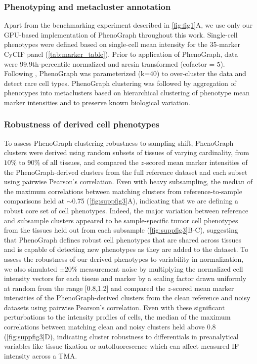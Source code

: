 \documentclass[preprint,review,3p,12pt]{elsarticle}
\begin{document}
\subsubsection{Phenotyping and metacluster annotation}
Apart from the benchmarking experiment described in \autoref{fig:fig1}A, we use only our GPU-based implementation of PhenoGraph throughout this work. Single-cell phenotypes were defined based on single-cell mean intensity for the 35-marker CyCIF panel (\autoref{tab:marker_table}). Prior to application of PhenoGraph, data were 99.9th-percentile normalized and arcsin transformed (cofactor = 5). Following \cite{jackson_single-cell_2020}, PhenoGraph was parameterized (k=$40$) to over-cluster the data and detect rare cell types. PhenoGraph clustering was followed by aggregation of phenotypes into metaclusters based on hierarchical clustering of phenotype mean marker intensities and to preserve known biological variation. \\

\subsubsection{Robustness of derived cell phenotypes}
To assess PhenoGraph clustering robustness to sampling shift, PhenoGraph clusters were derived using random subsets of tissues of varying cardinality, from $10\%$ to $90\%$ of all tissues, and compared the $z$-scored mean marker intensities of the PhenoGraph-derived clusters from the full reference dataset and each subset using pairwise Pearson's correlation. Even with heavy subsampling, the median of the maximum correlations between matching clusters from reference-to-sample comparisons held at $\sim$0.75 (\autoref{fig:suppfig3}A), indicating that we are defining a robust core set of cell phenotypes. Indeed, the major variation between reference and subsample clusters appeared to be sample-specific tumor cell phenotypes from the tissues held out from each subsample (\autoref{fig:suppfig3}B-C), suggesting that PhenoGraph defines robust cell phenotypes that are shared across tissues and is capable of detecting new phenotypes as they are added to the dataset. To assess the robustness of our derived phenotypes to variability in normalization, we also simulated $\pm20\%$ measurement noise by multiplying the normalized cell intensity vectors for each tissue and marker by a scaling factor drawn uniformly at random from the range [0.8,1.2] and compared the $z$-scored mean marker intensities of the PhenoGraph-derived clusters from the clean reference and noisy datasets using pairwise Pearson's correlation. Even with these significant perturbations to the intensity profiles of cells, the median of the maximum correlations between matching clean and noisy clusters held above 0.8 (\autoref{fig:suppfig3}D), indicating cluster robustness to differentials in preanalytical variables like tissue fixation or autofluorescence which can affect measured IF intensity across a TMA.
\end{document}
